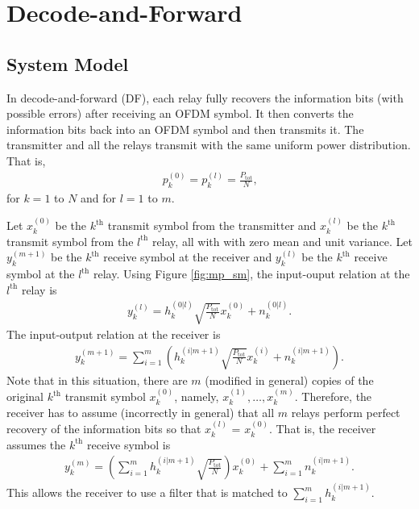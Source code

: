 \section{Decode-and-Forward}
\label{sec:mp_df}

\subsection{System Model}
\label{subsec:mp_df_sm}

In decode-and-forward (DF), each relay fully recovers the information bits (with possible errors) after receiving an OFDM symbol.  It then converts the information bits back into an OFDM symbol and then transmits it.  The transmitter and all the relays transmit with the same uniform power distribution.  That is,
\begin{eqnarray}
p_k^{(0)} = p_k^{(l)} = \frac{P_{\mbox{tot}}}{N}\mbox{,}
\end{eqnarray}
for $k = 1$ to $N$ and for $l = 1$ to $m$.

Let $x_k^{(0)}$ be the $k^{\mbox{th}}$ transmit symbol from the transmitter and  $x_k^{(l)}$ be the $k^{\mbox{th}}$ transmit symbol from the $l^{\mbox{th}}$ relay, all with with zero mean and unit variance.  Let $y_k^{(m+1)}$ be the $k^{\mbox{th}}$ receive symbol at the receiver and  $y_k^{(l)}$ be the $k^{\mbox{th}}$ receive symbol at the $l^{\mbox{th}}$ relay.  Using Figure \ref{fig:mp_sm}, the input-ouput relation at the $l^{\mbox{th}}$ relay is
\begin{eqnarray}
y_k^{(l)} = h_k^{(0|l)} \sqrt{\frac{P_{\mbox{tot}}}{N}} x_k^{(0)} + n_k^{(0|l)} \mbox{.}
\end{eqnarray}
The input-output relation at the receiver is
\begin{eqnarray}
y_k^{(m+1)} = \sum_{i=1}^m\left( h_k^{(i|m+1)}  \sqrt{\frac{P_{\mbox{tot}}}{N}} x_k^{(i)} + n_k^{(i|m+1)} \right)\mbox{.}
\end{eqnarray}
Note that in this situation, there are $m$ (modified in general) copies of the original $k^{\mbox{th}}$ transmit symbol $x_k^{(0)}$, namely, $x_k^{(1)}, \ldots, x_k^{(m)}$.  Therefore, the receiver has to assume (incorrectly in general) that all $m$ relays perform perfect recovery of the information bits so that $x_k^{(l)}$ = $x_k^{(0)}$.  That is, the receiver assumes the $k^{\mbox{th}}$ receive symbol is
\begin{eqnarray}
y_k^{(m)} = \left( \sum_{i=1}^m h_k^{(i|m+1)}  \sqrt{\frac{P_{\mbox{tot}}}{N}} \right) x_k^{(0)} + \sum_{i=1}^m n_k^{(i|m+1)} \mbox{.}
\end{eqnarray}
This allows the receiver to use a filter that is matched to $\displaystyle \sum_{i=1}^m h_k^{(i|m+1)}$.

